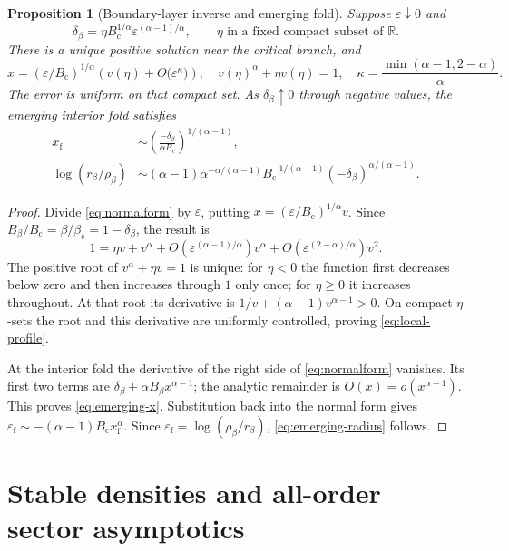 \documentclass[11pt,a4paper]{article}
\numberwithin{equation}{section}
\newtheorem{proposition}[theorem]{Proposition}
\theoremstyle{definition}
\theoremstyle{remark}
\newcommand{\R}{\mathbb R}
\newcommand{\bc}{\beta_{\mathrm c}}
\newcommand{\Bc}{B_{\mathrm c}}
\begin{document}
\begin{proposition}[Boundary-layer inverse and emerging fold]
\label{prop:local-crossover}
Suppose $\varepsilon\downarrow0$ and
\[
 \delta_\beta=\eta\Bc^{1/\alpha}\varepsilon^{(\alpha-1)/\alpha},
 \qquad \eta\text{ in a fixed compact subset of }\R.
\]
There is a unique positive solution near the critical branch, and
\begin{equation}\label{eq:local-profile}
 x=(\varepsilon/\Bc)^{1/\alpha}
   \left(v(\eta)+O\bigl(\varepsilon^{\kappa}\bigr)\right),
 \quad v(\eta)^\alpha+\eta v(\eta)=1,
 \quad \kappa=\frac{\min(\alpha-1,2-\alpha)}\alpha.
\end{equation}
The error is uniform on that compact set. As $\delta_\beta\uparrow0$
through negative values, the emerging interior fold satisfies
\begin{align}
 x_{\mathrm f}&\sim
       \left(\frac{-\delta_\beta}{\alpha\Bc}\right)^{1/(\alpha-1)},
       \label{eq:emerging-x}\\
 \log(r_\beta/\rho_\beta)&\sim
 (\alpha-1)\alpha^{-\alpha/(\alpha-1)}
 \Bc^{-1/(\alpha-1)}(-\delta_\beta)^{\alpha/(\alpha-1)}.
 \label{eq:emerging-radius}
\end{align}
\end{proposition}
\begin{proof}
Divide \eqref{eq:normalform} by $\varepsilon$, putting
$x=(\varepsilon/\Bc)^{1/\alpha}v$.
Since $B_\beta/\Bc=\beta/\bc=1-\delta_\beta$, the result is
\[
 1=\eta v+v^\alpha
      +O(\varepsilon^{(\alpha-1)/\alpha})v^\alpha
      +O(\varepsilon^{(2-\alpha)/\alpha})v^2.
\]
The positive root of $v^\alpha+\eta v=1$ is unique: for $\eta<0$ the
function first decreases below zero and then increases through $1$ only
once; for $\eta\ge0$ it increases throughout. At that root its derivative
is $1/v+(\alpha-1)v^{\alpha-1}>0$. On compact $\eta$-sets the root and
this derivative are uniformly controlled, proving \eqref{eq:local-profile}.

At the interior fold the derivative of the right side of
\eqref{eq:normalform} vanishes. Its first two terms are
$\delta_\beta+\alpha B_\beta x^{\alpha-1}$; the analytic remainder is
$O(x)=o(x^{\alpha-1})$. This proves \eqref{eq:emerging-x}. Substitution
back into the normal form gives
$\varepsilon_{\mathrm f}\sim-(\alpha-1)\Bc x_{\mathrm f}^\alpha$.
Since $\varepsilon_{\mathrm f}=\log(\rho_\beta/r_\beta)$,
\eqref{eq:emerging-radius} follows.
\end{proof}

\section{Stable densities and all-order sector asymptotics}
\label{sec:stable}
\end{document}
